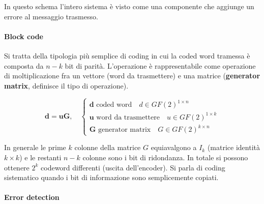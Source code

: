 \begin{center}

\end{center}

In questo schema l'intero sistema è visto come una componente che aggiunge un errore al messaggio trasmesso.

\paragraph*{Block code}
Si tratta della tipologia più semplice di coding in cui la coded word tramessa è composta da $n-k$ bit di parità.
L'operazione è rappresentabile come operazione di moltiplicazione fra un vettore (word da trasmettere) e una matrice (\textbf{generator matrix}, definisce il tipo di operazione).

\[
    \mathbf{d} = \mathbf{uG}, \quad \begin{cases}
        \mathbf{d} \text{ coded word} \quad d \in GF(2)^{1 \times n} \\
        \mathbf{u} \text{ word da trasmettere} \quad u \in GF(2)^{1 \times k} \\
        \mathbf{G} \text{ generator matrix} \quad G \in GF(2)^{k \times n}
    \end{cases}
\]

In generale le prime $k$ colonne della matrice $G$ equiavalgono a $I_k$ (matrice identità $k \times k$) e le restanti $n-k$ colonne sono i bit di ridondanza.
In totale si possono ottenere $2^k$ codeword differenti (uscita dell'encoder).
Si parla di coding sistematico quando i bit di informazione sono semplicemente copiati.

\paragraph*{Error detection}

